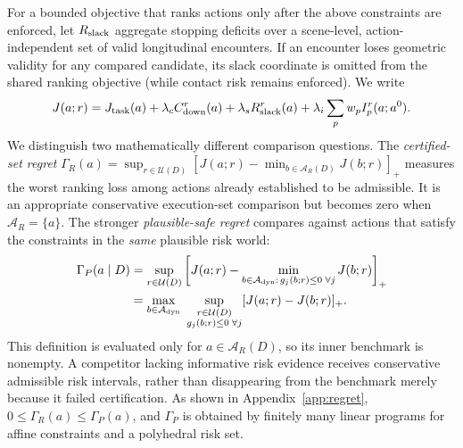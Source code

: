 \documentclass[10pt]{article}
\begin{document}
For a bounded objective that ranks actions only after the above constraints are enforced, let $R_{\rm slack}$ aggregate stopping deficits over a scene-level, action-independent set of valid longitudinal encounters. If an encounter loses geometric validity for any compared candidate, its slack coordinate is omitted from the shared ranking objective (while contact risk remains enforced). We write
\begin{equation}
 J(a;r)=J_{\rm task}(a)+\lambda_c C_{\rm down}^{r}(a)
 +\lambda_s R_{\rm slack}^{r}(a)+\lambda_i\sum_p w_p I_p^{r}(a;a^0).
 \label{eq:decisionobj}
\end{equation}
We distinguish two mathematically different comparison questions. The \emph{certified-set regret}
$\Gamma_R(a)=\sup_{r\in\mathcal U(D)}[J(a;r)-\min_{b\in\mathcal A_R(D)}J(b;r)]_+$
measures the worst ranking loss among actions already established to be admissible. It is an appropriate conservative execution-set comparison but becomes zero when $\mathcal A_R=\{a\}$. The stronger \emph{plausible-safe regret} compares against actions that satisfy the constraints in the \emph{same} plausible risk world:
\begin{align}
 \Gamma_P(a\mid D)
 &=\sup_{r\in\mathcal U(D)}\left[J(a;r)-
 \min_{b\in\mathcal A_{\rm dyn}:\,g_j(b;r)\le0\;\forall j}J(b;r)\right]_+\nonumber\\
 &=\max_{b\in\mathcal A_{\rm dyn}}\ \sup_{\substack{r\in\mathcal U(D)\\g_j(b;r)\le0\;\forall j}}
 [J(a;r)-J(b;r)]_+.
 \label{eq:plausibleregret}
\end{align}
This definition is evaluated only for $a\in\mathcal A_R(D)$, so its inner benchmark is nonempty. A competitor lacking informative risk evidence receives conservative admissible risk intervals, rather than disappearing from the benchmark merely because it failed certification. As shown in Appendix~\ref{app:regret}, $0\le\Gamma_R(a)\le\Gamma_P(a)$, and $\Gamma_P$ is obtained by finitely many linear programs for affine constraints and a polyhedral risk set.
\end{document}
